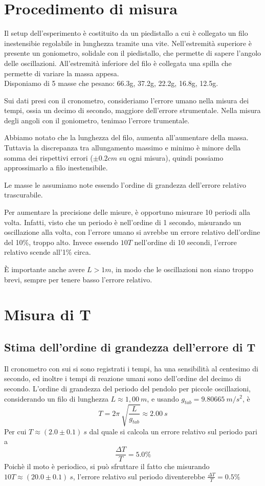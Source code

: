\documentclass[12pt, a4paper]{article}
\begin{document}
    
\section{Procedimento di misura}
Il setup dell'esperimento è costituito da un piedistallo a cui è collegato un filo inestensibie regolabile in lunghezza tramite una vite. Nell'estremità superiore è presente un goniometro, solidale con il piedistallo, che permette di sapere l'angolo delle oscillazioni. All'estremità inferiore del filo è collegata una spilla che permette di variare la massa appesa. \\
Disponiamo di 5 masse che pesano: 66.3g, 37.2g, 22.2g, 16.8g, 12.5g.

Sui dati presi con il cronometro, consideriamo l'errore umano nella misura dei tempi, ossia un decimo di secondo, maggiore dell'errore strumentale. 
Nella misura degli angoli con il goniometro, tenimao l'errore trumentale. 

Abbiamo notato che la lunghezza del filo, aumenta all'aumentare della massa. Tuttavia la discrepanza tra allungamento massimo e minimo è minore della somma dei rispettivi errori ($\pm0.2cm$ su ogni misura), quindi possiamo approssimarlo a filo inestensibile.

Le masse le assumiamo note essendo l'ordine di grandezza dell'errore relativo trascurabile.

Per aumentare la precisione delle misure, è opportuno misurare 10 periodi alla volta.
Infatti, visto che un periodo è nell'ordine di 1 secondo, misurando un oscillazione alla volta, con l'errore umano si avrebbe un errore relativo dell'ordine del 10\%, troppo alto.
Invece essendo $10T$ nell'ordine di 10 secondi, l'errore relativo scende all'1\% circa.

È importante anche avere $L > 1m$, in modo che le oscillazioni non siano troppo brevi, sempre per tenere basso l'errore relativo.


\section{Misura di T}
\subsection{Stima dell'ordine di grandezza dell'errore di T}
Il cronometro con sui si sono registrati i tempi, ha una sensibilità al centesimo di secondo, ed inoltre i tempi di reazione umani sono dell'ordine del decimo di secondo. L'ordine di grandezza del periodo del pendolo per piccole oscillazioni, considerando un filo di lunghezza $L\approx 1,00\ m$, e usando $g_{tab}=9.80665 \ m/s^2$, è
\begin{equation*}
    T= 2\pi\ \sqrt{\frac{L}{g_{tab}}}\approx 2.00\ s
\end{equation*}
Per cui $T\approx(2.0\pm 0.1)\ s$ dal quale si calcola un errore relativo sul periodo pari a
 \begin{equation*}
     \frac{\Delta T}{T}=5.0\%
 \end{equation*}
Poichè il moto è periodico, si può sfruttare il fatto che misurando $10T\approx(20.0\pm 0.1)\ s$, l'errore relativo sul periodo diventerebbe $\displaystyle \frac{\Delta T}{T} = 0.5\% $
\newpage
\end{document}
